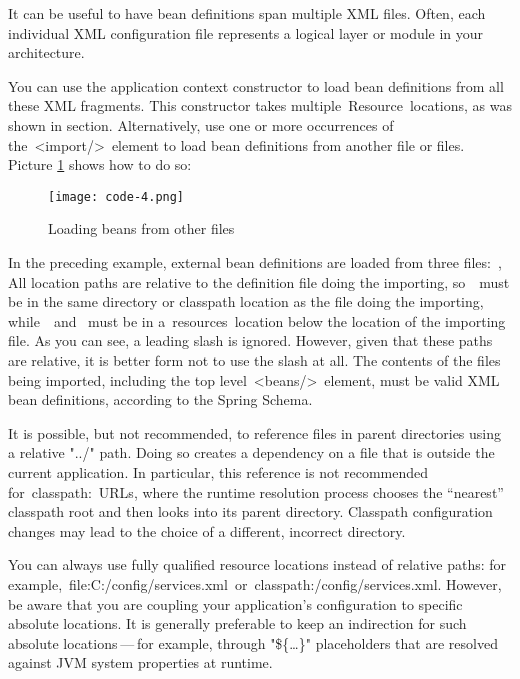It can be useful to have bean definitions span multiple XML files. Often, each individual XML configuration file represents a logical layer or module in your architecture.

You can use the application context constructor to load bean definitions from all these XML fragments. This constructor takes multiple Resource locations, as was shown in section. Alternatively, use one or more occurrences of the <import/> element to load bean definitions from another file or files. Picture \ref{fig:spring-code-4-en} shows how to do so:

\begin{figure}[!ht]
  \centering
  \texttt{[image: code-4.png]}
  \caption{Loading beans from other files}
  \label{fig:spring-code-4-en}
\end{figure}

In the preceding example, external bean definitions are loaded from three files: , All location paths are relative to the definition file doing the importing, so  must be in the same directory or classpath location as the file doing the importing, while  and  must be in a resources location below the location of the importing file. As you can see, a leading slash is ignored. However, given that these paths are relative, it is better form not to use the slash at all. The contents of the files being imported, including the top level <beans/> element, must be valid XML bean definitions, according to the Spring Schema.

It is possible, but not recommended, to reference files in parent directories using a relative "../" path. Doing so creates a dependency on a file that is outside the current application. In particular, this reference is not recommended for classpath: URLs, where the runtime resolution process chooses the “nearest” classpath root and then looks into its parent directory. Classpath configuration changes may lead to the choice of a different, incorrect directory.

You can always use fully qualified resource locations instead of relative paths: for example, file:C:/config/services.xml or classpath:/config/services.xml. However, be aware that you are coupling your application’s configuration to specific absolute locations. It is generally preferable to keep an indirection for such absolute locations — for example, through "\$\{…​\}" placeholders that are resolved against JVM system properties at runtime.

